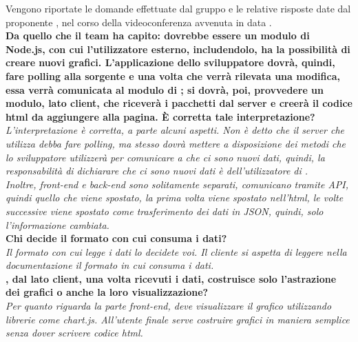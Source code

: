 
Vengono riportate le domande effettuate dal gruppo \groupname{} e le relative risposte date dal proponente \proponente{}, nel corso della videoconferenza avvenuta in data .\\
	
	\textbf{Da quello che il team ha capito: \projectname{} dovrebbe essere un modulo di Node.js, con cui l'utilizzatore esterno, includendolo, ha la possibilità di creare nuovi grafici. L'applicazione dello sviluppatore dovrà, quindi, fare polling alla sorgente e una volta che verrà rilevata una modifica, essa verrà comunicata al modulo di \projectname{}; si dovrà, poi, provvedere un modulo, lato client, che riceverà i pacchetti dal server e creerà il codice html da aggiungere alla pagina. \`{E} corretta tale interpretazione?}\\
	\textit{L'interpretazione è corretta, a parte alcuni aspetti. Non è detto che il server che utilizza \projectname{} debba fare polling, ma \projectname{} stesso dovrà mettere a disposizione dei metodi che lo sviluppatore utilizzerà per comunicare a \projectname{} che ci sono nuovi dati, quindi, la responsabilità di dichiarare che ci sono nuovi dati è dell'utilizzatore di \projectname{}.\\
	Inoltre, front-end e back-end sono solitamente separati, comunicano tramite API, quindi quello che viene spostato, la prima volta viene spostato nell'html, le volte successive viene spostato come trasferimento dei dati in JSON, quindi, solo l'informazione cambiata.}\\
	
	\textbf{Chi decide il formato con cui \projectname{} consuma i dati?}\\
	\textit{Il formato con cui \projectname{} legge i dati lo decidete voi. Il cliente si aspetta di leggere nella documentazione il formato in cui \projectname{} consuma i dati.}\\
	
	\textbf{\projectname{}, dal lato client, una volta ricevuti i dati, costruisce solo l'astrazione dei grafici o anche la loro visualizzazione?}\\
	\textit{Per quanto riguarda la parte front-end, \projectname{} deve visualizzare il grafico utilizzando librerie come chart.js. All'utente finale serve costruire grafici in maniera semplice senza dover scrivere codice html.}\\
	
